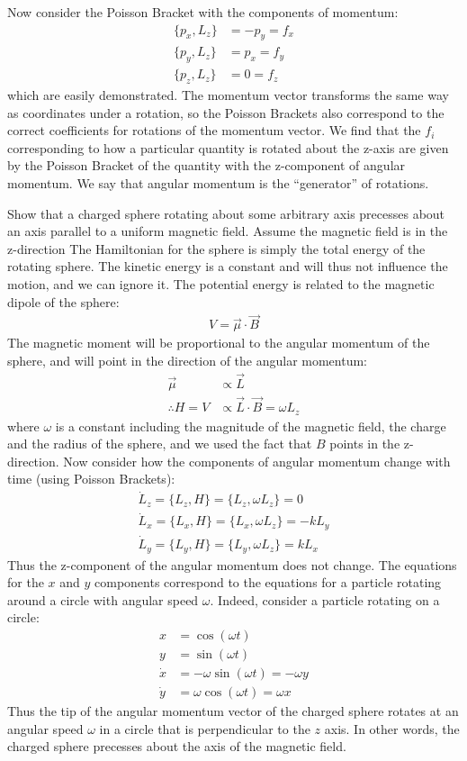 Now consider the Poisson Bracket with the components of momentum:
\begin{align}
\{p_x,L_z\}&=-p_y=f_x\nonumber\\
\{p_y,L_z\}&=p_x=f_y\nonumber\\
\{p_z,L_z\}&=0=f_z
\end{align}
which are easily demonstrated. The momentum vector transforms the same way as coordinates under a rotation, so the Poisson Brackets also correspond to the correct coefficients for rotations of the momentum vector. We find that the $f_i$ corresponding to how a particular quantity is rotated about the z-axis are given by the Poisson Bracket of the quantity with the z-component of angular momentum. We say that angular momentum is the ``generator'' of rotations.

\begin{example}{0pt}{Show that a charged sphere rotating about some arbitrary axis precesses about an axis parallel to a uniform magnetic field. Assume the magnetic field is in the z-direction}{}
The Hamiltonian for the sphere is simply the total energy of the rotating sphere. The kinetic energy is a constant and will thus not influence the motion, and we can ignore it. The potential energy is related to the magnetic dipole of the sphere:
\begin{align*}
V=\vec\mu\cdot\vec B
\end{align*}
The magnetic moment will be proportional to the angular momentum of the sphere, and will point in the direction of the angular momentum:
\begin{align*}
\vec\mu&\propto \vec L\\
\therefore H=V&\propto \vec L\cdot \vec B=\omega L_z
\end{align*}
where $\omega$ is a constant including the magnitude of the magnetic field, the charge and the radius of the sphere, and we used the fact that $B$ points in the z-direction. Now consider how the components of angular momentum change with time (using Poisson Brackets):
\begin{align}
\dot L_z=\{L_z,H\}=\{L_z,\omega L_z\}=0\\
\dot L_x=\{L_x,H\}=\{L_x,\omega L_z\}=-kL_y\\
\dot L_y=\{L_y,H\}=\{L_y,\omega L_z\}=kL_x
\end{align}
Thus the z-component of the angular momentum does not change. The equations for the $x$ and $y$ components correspond to the equations for a particle rotating around a circle with angular speed $\omega$. Indeed, consider a particle rotating on a circle:
\begin{align*}
x&=\cos(\omega t)\\
y&=\sin(\omega t)\\
\dot x &=-\omega\sin(\omega t)=-\omega y\\
\dot y &=\omega\cos(\omega t)=\omega x
\end{align*}
Thus the tip of the angular momentum vector of the charged sphere rotates at an angular speed $\omega$ in a circle that is perpendicular to the $z$ axis. In other words, the charged sphere precesses about the axis of the magnetic field.
\end{example}

